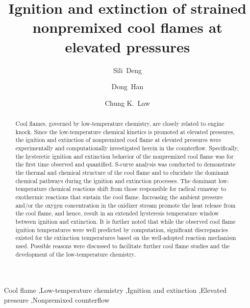 \documentclass[review,3p,times]{elsarticle}
\begin{document}
\begin{frontmatter}

\title{Ignition and extinction of strained nonpremixed cool flames at elevated pressures}

\author{Sili~Deng}
\author{Dong~Han}
\author{Chung K.~Law}

\address{Department of Mechanical and Aerospace Engineering, Princeton University, Princeton, NJ 08544, USA}

\begin{abstract}

Cool flames, governed by low-temperature chemistry, are closely related to engine knock.  Since the low-temperature chemical kinetics is promoted at elevated pressures, the ignition and extinction of nonpremixed cool flame at elevated pressures were experimentally and computationally investigated herein in the counterflow.  Specifically, the hysteretic ignition and extinction behavior of the nonpremixed cool flame was for the first time observed and quantified.  S-curve analysis was conducted to demonstrate the thermal and chemical structure of the cool flame and to elucidate the dominant chemical pathways during the ignition and extinction processes.  The dominant low-temperature chemical reactions shift from those responsible for radical runaway to exothermic reactions that sustain the cool flame.  Increasing the ambient pressure and/or the oxygen concentration in the oxidizer stream promote the heat release from the cool flame, and hence, result in an extended hysteresis temperature window between ignition and extinction.  It is further noted that while the observed cool flame ignition temperatures were well predicted by computation, significant discrepancies existed for the extinction temperatures based on the well-adopted reaction mechanism used.  Possible reasons were discussed to facilitate further cool flame studies and the development of the low-temperature chemistry.

\end{abstract}

\begin{keyword} 
Cool flame \sep Low-temperature chemistry \sep Ignition and extinction \sep Elevated pressure \sep Nonpremixed counterflow 
\end{keyword}

\end{frontmatter}
\end{document}
